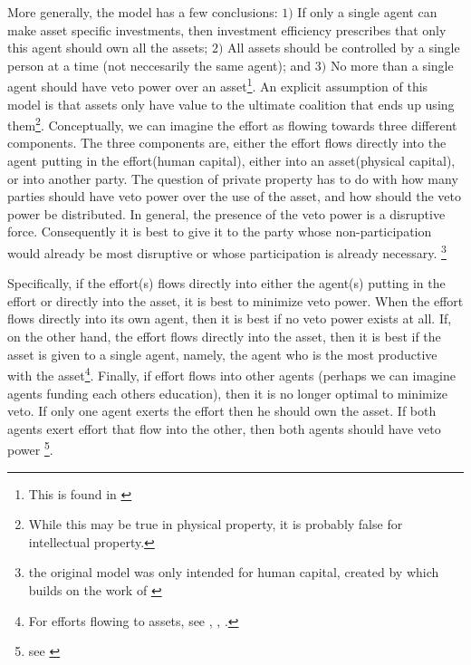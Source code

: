 More generally, the model has a few conclusions: $1)$ If only a single agent can make asset specific investments, then investment efficiency prescribes that only this agent should own all the assets; $2)$ All assets should be controlled by a single person at a time (not neccesarily the same agent); and $3)$ No more than a single agent should have veto power over an asset\footnote{This is found in \cite{Hart1990}}. An explicit assumption of this model is that assets only have value to the ultimate coalition that ends up using them\footnote{While this may be true in physical property, it is probably false for intellectual property.}. Conceptually, we can imagine the effort as flowing towards three different components. The three components are, either the effort flows directly into the agent putting in the effort(human capital), either into an asset(physical capital), or into another party. The question of private property has to do with how many parties should have veto power over the use of the asset, and how should the veto power be distributed. In general, the presence of the veto power is a disruptive force. Consequently it is best to give it to the party whose non-participation would already be most disruptive or whose participation is already necessary. \footnote{the original model was only intended for human capital, created by \cite{Hart1990} which builds on the work of \cite{Grossman1986} }

Specifically, if the effort(s) flows directly into either the agent(s) putting in the effort or directly into the asset, it is best to minimize veto power. When the effort flows directly into its  own agent, then it is best if no veto power exists at all. If, on the other hand, the effort flows directly into the asset, then it is best if the asset is given to a single agent, namely, the agent who is the most productive with the asset\footnote{For efforts flowing to assets, see \cite{schmitz2013investments}, \citet{gattai2016investment}, \cite{schmitz2017incomplete}. }. Finally, if effort flows into other agents (perhaps we can imagine agents funding each others education), then it is no longer optimal to minimize veto. If only one agent exerts the effort then he should own the asset. If both agents exert effort that flow into the other, then both agents should have veto power \footnote{see \cite{hamada2011incentive}}.

